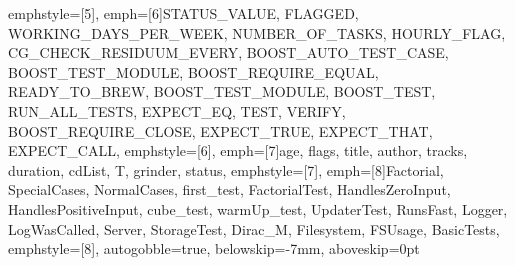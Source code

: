 {emphstyle=[5]{\color{Maroon}}, %
emph=[6]{STATUS_VALUE, FLAGGED, WORKING_DAYS_PER_WEEK, NUMBER_OF_TASKS, HOURLY_FLAG,
         CG_CHECK_RESIDUUM_EVERY, BOOST_AUTO_TEST_CASE, BOOST_TEST_MODULE, BOOST_REQUIRE_EQUAL,
         READY_TO_BREW, BOOST_TEST_MODULE, BOOST_TEST, RUN_ALL_TESTS, EXPECT_EQ, TEST, VERIFY,
         BOOST_REQUIRE_CLOSE, EXPECT_TRUE, EXPECT_THAT, EXPECT_CALL},
emphstyle=[6]{\color{Gray}}, %
emph=[7]{age, flags, title, author, tracks, duration, cdList, T, grinder, status},
emphstyle=[7]{\color{Peach!50!Purple}}, %
emph=[8]{Factorial, SpecialCases, NormalCases, first_test, FactorialTest, HandlesZeroInput,
         HandlesPositiveInput, cube_test, warmUp_test, UpdaterTest, RunsFast, Logger, LogWasCalled,
         Server, StorageTest, Dirac_M, Filesystem, FSUsage, BasicTests},
emphstyle=[8]{\color{Blue}}, %
autogobble=true, %
belowskip=-7mm,
aboveskip=0pt
}

